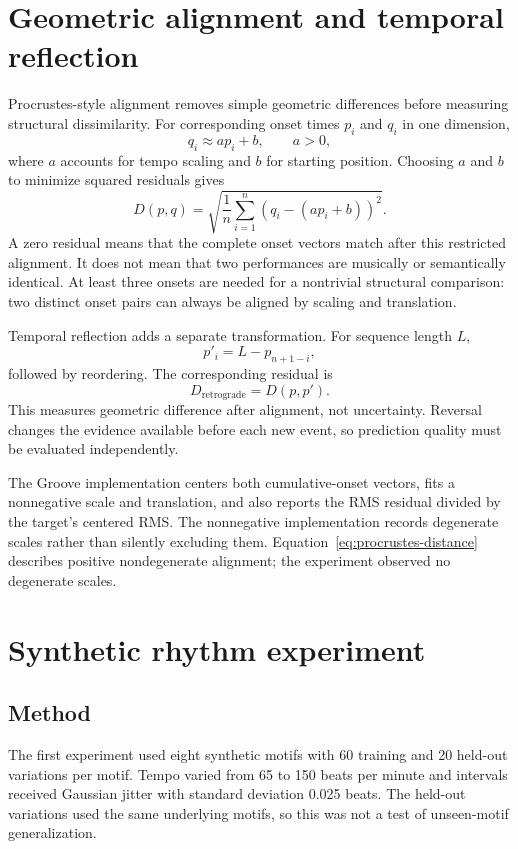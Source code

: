 \documentclass[11pt,a4paper]{article}
\begin{document}
\section{Geometric alignment and temporal reflection}
Procrustes-style alignment removes simple geometric differences before measuring structural dissimilarity. For corresponding onset times $p_i$ and $q_i$ in one dimension,
\begin{equation}
q_i\approx ap_i+b,\qquad a>0,
\end{equation}
where $a$ accounts for tempo scaling and $b$ for starting position. Choosing $a$ and $b$ to minimize squared residuals gives
\begin{equation}
D(p,q)=\sqrt{\frac{1}{n}\sum_{i=1}^{n}\left(q_i-(ap_i+b)\right)^2}.
\label{eq:procrustes-distance}
\end{equation}
A zero residual means that the complete onset vectors match after this restricted alignment. It does not mean that two performances are musically or semantically identical. At least three onsets are needed for a nontrivial structural comparison: two distinct onset pairs can always be aligned by scaling and translation.

Temporal reflection adds a separate transformation. For sequence length $L$,
\begin{equation}
p'_i=L-p_{n+1-i},
\end{equation}
followed by reordering. The corresponding residual is
\begin{equation}
D_{\mathrm{retrograde}}=D(p,p').
\end{equation}
This measures geometric difference after alignment, not uncertainty. Reversal changes the evidence available before each new event, so prediction quality must be evaluated independently.

The Groove implementation centers both cumulative-onset vectors, fits a nonnegative scale and translation, and also reports the RMS residual divided by the target's centered RMS. The nonnegative implementation records degenerate scales rather than silently excluding them. Equation~\ref{eq:procrustes-distance} describes positive nondegenerate alignment; the experiment observed no degenerate scales.

\section{Synthetic rhythm experiment}
\subsection{Method}
The first experiment used eight synthetic motifs with 60 training and 20 held-out variations per motif. Tempo varied from 65 to 150 beats per minute and intervals received Gaussian jitter with standard deviation 0.025 beats. The held-out variations used the same underlying motifs, so this was not a test of unseen-motif generalization.
\end{document}
